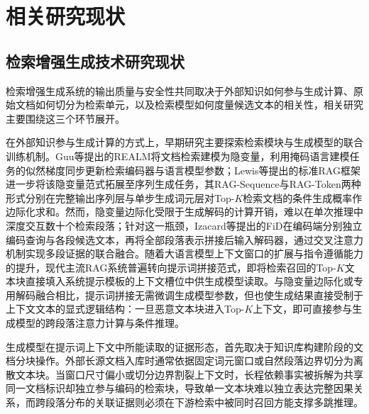 \section{相关研究现状}

\subsection{检索增强生成技术研究现状}

检索增强生成系统的输出质量与安全性共同取决于外部知识如何参与生成计算、原始文档如何切分为检索单元，以及检索模型如何度量候选文本的相关性，相关研究主要围绕这三个环节展开。

在外部知识参与生成计算的方式上，早期研究主要探索检索模块与生成模型的联合训练机制。Guu等\cite{guu2020realm}提出的REALM将文档检索建模为隐变量，利用掩码语言建模任务的似然梯度同步更新检索编码器与语言模型参数；Lewis等\cite{lewis2020retrieval}提出的标准RAG框架进一步将该隐变量范式拓展至序列生成任务，其RAG-Sequence与RAG-Token两种形式分别在完整输出序列层与单步生成词元层对Top-$K$检索文档的条件生成概率作边际化求和。然而，隐变量边际化受限于生成解码的计算开销，难以在单次推理中深度交互数十个检索段落；针对这一瓶颈，Izacard等\cite{izacard2021leveraging}提出的FiD在编码端分别独立编码查询与各段候选文本，再将全部段落表示拼接后输入解码器，通过交叉注意力机制实现多段证据的联合融合。随着大语言模型上下文窗口的扩展与指令遵循能力的提升，现代主流RAG系统普遍转向提示词拼接范式，即将检索召回的Top-$K$文本块直接填入系统提示模板的上下文槽位中供生成模型读取\cite{gao2023retrieval}。与隐变量边际化或专用解码融合相比，提示词拼接无需微调生成模型参数，但也使生成结果直接受制于上下文文本的显式逻辑结构：一旦恶意文本块进入Top-$K$上下文，即可直接参与生成模型的跨段落注意力计算与条件推理。

生成模型在提示词上下文中所能读取的证据形态，首先取决于知识库构建阶段的文档分块操作。外部长源文档入库时通常依据固定词元窗口或自然段落边界切分为离散文本块\cite{gao2023retrieval}。当窗口尺寸偏小或切分边界割裂上下文时，长程依赖事实被拆解为共享同一文档标识却独立参与编码的检索块，导致单一文本块难以独立表达完整因果关系，而跨段落分布的关联证据则必须在下游检索中被同时召回方能支撑多跳推理。

